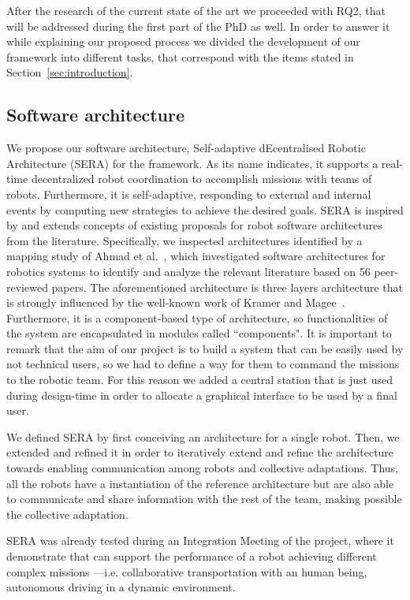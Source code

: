 After the research of the current state of the art we proceeded with RQ2, that will be addressed during the first part of the PhD as well.
In order to answer it while explaining our proposed process we divided the development of our framework into different tasks, that correspond with the items stated in Section~\ref{sec:introduction}.

\subsection{Software architecture}
\label{sec:softwarearch}

We propose our software architecture, Self-adaptive dEcentralised Robotic Architecture (SERA) for the framework.
As its name indicates, it supports a real-time decentralized robot coordination to accomplish missions with teams of robots. 
Furthermore, it is self-adaptive, responding to external and internal events by computing new strategies to achieve the desired goals.
SERA is inspired by and extends concepts of existing proposals for robot software architectures from the literature. 
Specifically, we inspected architectures identified by a mapping study of Ahmad et al.~\cite{Ahmad201616}, which investigated software architectures for robotics systems to identify and analyze the relevant literature based on 56 peer-reviewed papers.
The aforementioned architecture is three layers architecture that is strongly influenced by the well-known work of Kramer and Magee~\cite{kramer}.
Furthermore, it is a component-based type of architecture, so functionalities of the system are encapsulated in modules called ``components".
It is important to remark that the aim of our project is to build a system that can be easily used by not technical users, so we had to define a way for them to command the missions to the robotic team.
For this reason we added a central station that is just used during design-time in order to allocate a graphical interface to be used by a final user.

We defined SERA by first conceiving an architecture for a single robot. 
Then, we extended and refined it in order to iteratively extend and refine the architecture towards enabling communication among robots and collective adaptations. 
Thus, all the robots have a instantiation of the reference architecture but are also able to communicate and share information with the rest of the team, making possible the collective adaptation. 

SERA was already tested during an Integration Meeting of the project, where it demonstrate that can support the performance of a robot achieving different complex missions ---i.e. collaborative transportation with an human being, autonomous driving in a dynamic environment.

